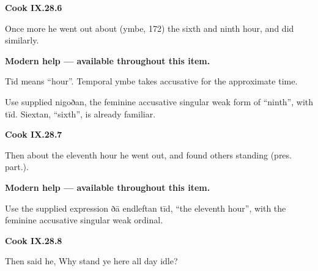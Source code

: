 \par\begin{minipage}{\linewidth}\raggedright
\textbf{Cook IX.28.6}

Once more he went out about (ymbe, 172) the sixth and ninth hour, and did similarly.

\textbf{Modern help — available throughout this item.}

\end{minipage}\par\addvspace{4pt}

Tīd means “hour”. Temporal ymbe takes accusative for the approximate time.

Use supplied nigoðan, the feminine accusative singular weak form of “ninth”, with tīd. Siextan, “sixth”, is already familiar.

\par\begin{minipage}{\linewidth}\raggedright
\textbf{Cook IX.28.7}

Then about the eleventh hour he went out, and found others standing (pres. part.).

\textbf{Modern help — available throughout this item.}

\end{minipage}\par\addvspace{4pt}

Use the supplied expression ðā endleftan tīd, “the eleventh hour”, with the feminine accusative singular weak ordinal.

\par\begin{minipage}{\linewidth}\raggedright
\textbf{Cook IX.28.8}

Then said he, Why stand ye here all day idle?

\end{minipage}\par\addvspace{4pt}

